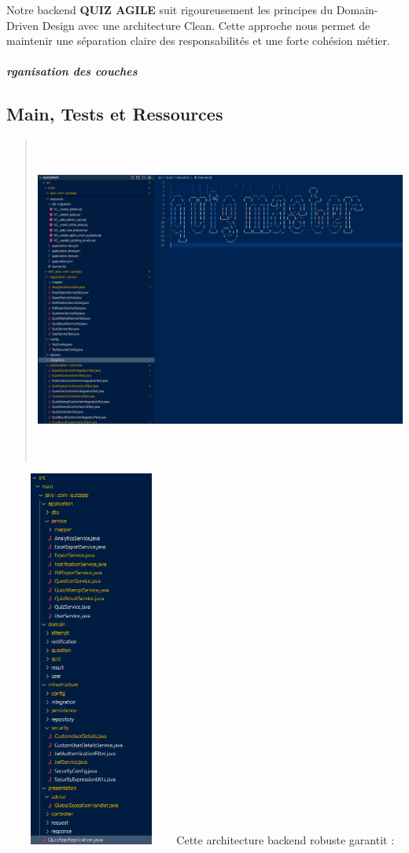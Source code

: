\documentclass[12pt,a4paper,twoside]{report}
\begin{document}
Notre backend \textbf{QUIZ AGILE} suit rigoureusement les principes du
Domain-Driven Design avec une architecture Clean. Cette approche nous
permet de maintenir une séparation claire des responsabilités et une
forte cohésion métier.

\hypertarget{rganisation-des-couches}{%
\subparagraph{rganisation des couches}\label{rganisation-des-couches}}

\hypertarget{main-tests-et-ressources}{%
\subsection{Main, Tests et Ressources}\label{main-tests-et-ressources}}

\begin{quote}
\includegraphics[width=5.44097in,height=4.22361in]{latex_media/media/image46.png}
\end{quote}

\includegraphics[width=2.25347in,height=4.90556in]{latex_media/media/image47.png}Cette
architecture backend robuste garantit :
\end{document}
